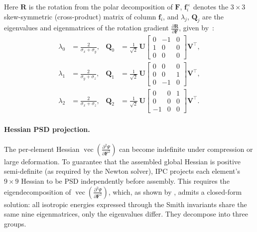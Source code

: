 \documentclass{article}
\newcommand{\pdc}[2]{\frac{\partial #1}{\partial #2}}
\begin{document}
Here $\mathbf{R}$ is the rotation from the polar decomposition of
$\mathbf{F}$, $\mathbf{f}_i^{\times}$ denotes the $3\times 3$
skew-symmetric (cross-product) matrix of column $\mathbf{f}_i$, and
$\lambda_j$, $\mathbf{Q}_j$ are the eigenvalues and eigenmatrices of
the rotation gradient $\pdc{\mathbf{R}}{\mathbf{F}}$, given
by~\cite{kim2020dynamic}:
\begin{equation}
\begin{aligned}
    \lambda_0 &= \frac{2}{\sigma_x + \sigma_y}, &
    \mathbf{Q}_0 &= \frac{1}{\sqrt{2}}\,\mathbf{U}
    \begin{bmatrix}
        0 & -1 & 0 \\
        1 &  0 & 0 \\
        0 &  0 & 0
    \end{bmatrix}
    \mathbf{V}^\top, \\[2ex]
    \lambda_1 &= \frac{2}{\sigma_y + \sigma_z}, &
    \mathbf{Q}_1 &= \frac{1}{\sqrt{2}}\,\mathbf{U}
    \begin{bmatrix}
        0 &  0 & 0 \\
        0 &  0 & 1 \\
        0 & -1 & 0
    \end{bmatrix}
    \mathbf{V}^\top, \\[2ex]
    \lambda_2 &= \frac{2}{\sigma_x + \sigma_z}, &
    \mathbf{Q}_2 &= \frac{1}{\sqrt{2}}\,\mathbf{U}
    \begin{bmatrix}
         0 & 0 & 1 \\
         0 & 0 & 0 \\
        -1 & 0 & 0
    \end{bmatrix}
    \mathbf{V}^\top.
\end{aligned}
\end{equation}

\paragraph{Hessian PSD projection.}
The per-element Hessian $\operatorname{vec}(\pdc{^2\Psi}{\mathbf{F}^2})$ can become indefinite under compression or large deformation. To guarantee that the assembled global Hessian is positive semi-definite (as required by the Newton solver), IPC projects each element's $9\times 9$ Hessian to be PSD independently before assembly. This requires the eigendecomposition of $\operatorname{vec}(\pdc{^2\Psi}{\mathbf{F}^2})$, which, as shown by \cite{smith2019analytic}, admits a closed-form solution: all isotropic energies expressed through the Smith invariants share the same nine eigenmatrices, only the eigenvalues differ. They decompose into three groups.
\end{document}
